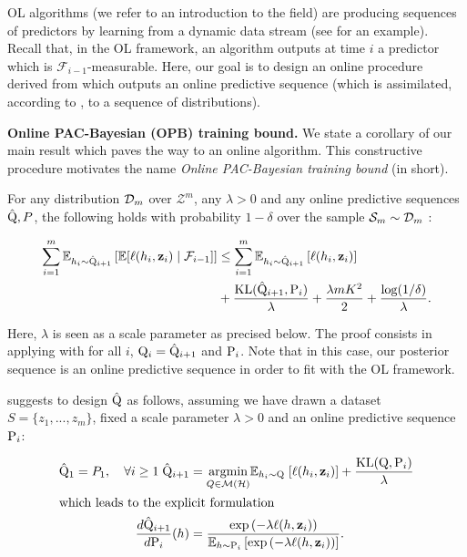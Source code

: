 OL algorithms (we refer to \citealp{hazan2016introduction}  an introduction to the field) are producing sequences of predictors by learning from a dynamic data stream (see  for an example). Recall that, in the OL framework, an algorithm outputs at time $i$ a predictor which is $\mathcal{F}_{i-1}$-measurable. Here, our goal is to design an online procedure derived from  which outputs an online predictive sequence (which is assimilated, according to , to a sequence of distributions).


\textbf{Online PAC-Bayesian (OPB) training bound.} We state a corollary of our main result which paves the way to an online algorithm. This constructive procedure motivates the name \emph{ Online PAC-Bayesian training bound} (\OPBTrain in short).

\begin{corollary}
  \label{cor: online_procedure}
  For any distribution $\Dm$ over $\mathcal{Z}^m$, any $\lambda>0$ and any online predictive sequences $\hat{\Q},P$, the following holds with probability $1-\delta$ over the sample $\Sm\sim\Dm$ :

  \begin{align*}
    \sum_{i=1}^m \mathbb{E}_{h_i\sim \hat{\Q}_{i+1}}\left[ \mathbb{E}[\ell(h_i,\z_i) \mid \mathcal{F}_{i-1}]    \right] & \leq \sum_{i=1}^m \mathbb{E}_{h_i\sim \hat{\Q}_{i+1}}\left[ \ell(h_i,\z_i) \right] \\
    & + \frac{\operatorname{KL}(\hat{\Q}_{i+1}, \P_{i})}{\lambda} + \frac{\lambda m K^2}{2} + \frac{\log(1/\delta)}{\lambda}.
  \end{align*}
\end{corollary}
Here, $\lambda$ is seen as a scale parameter as precised below.
The proof consists in applying  with for all $i$, $\Q_{i}= \hat{\Q}_{i+1}$ and $\P_{i}$.
Note that in this case, our posterior sequence is an online predictive sequence in order to fit with the OL framework.


 suggests to design $\hat{\Q}$ as follows, assuming we have drawn a dataset $S= \{z_1,...,z_m\}$, fixed a scale parameter $\lambda>0$  and an online predictive sequence $\P_{i}$:

\begin{align}
  \label{eq: pacb_online_alg}
  \hat{\Q}_1= P_1, \quad \forall i\geq1\; \hat{\Q}_{i+1}&= \underset{Q\in\mathcal{M}(\mathcal{H})}{\mathrm{argmin}} \mathbb{E}_{h_i\sim \Q} \; [\ell(h_i,\z_i)] + \frac{\operatorname{KL}(\Q, \P_{i})}{\lambda} \\
  \intertext{which leads to the explicit formulation}
  \label{eq: catoni_formulation}
  \frac{d\hat{\Q}_{i+1}}{d\P_{i}}(h)& = \frac{\exp\left(-\lambda  \ell(h,\z_i)\right)}{\mathbb{E}_{h\sim \P_{i}}\left[\exp\left(-\lambda  \ell(h,\z_i)\right)\right]}.
\end{align}

